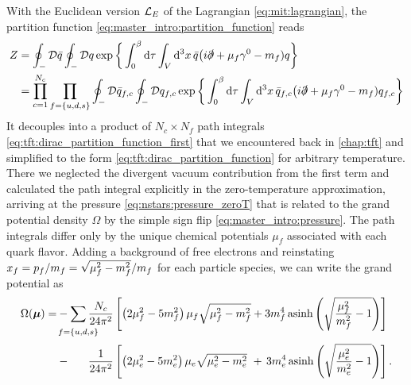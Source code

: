With the Euclidean version $\mathcal{L}_E$ of the Lagrangian \eqref{eq:mit:lagrangian},
the partition function \eqref{eq:master_intro:partition_function} reads
\begin{equation}
\begin{split}
	Z &= \oint_- \mathcal{D} \bar{q} \oint_- \mathcal{D} q \exp \bigg\{ \int_0^\beta \mathop{}\!\mathrm{d} \tau \int_V \mathop{}\!\mathrm{d}^3 x \, \bar{q} \big( i \slashed\partial + \mu_f \gamma^0 - m_f) q \bigg\} \\
	  &= \prod_{c=1}^{N_c} \prod_{f=\{u,d,s\}} \oint_- \mathcal{D} \bar{q}_{f,c} \oint_- \mathcal{D} q_{f,c} \exp \bigg\{ \int_0^\beta \mathop{}\!\mathrm{d} \tau \int_V \mathop{}\!\mathrm{d}^3 x \, \bar{q}_{f,c} \big( i \slashed\partial + \mu_f \gamma^0 - m_f) q_{f,c} \bigg\} \\
\end{split}
\end{equation}
It decouples into a product of $N_c \times N_f$ path integrals \eqref{eq:tft:dirac_partition_function_first} that we encountered back in \cref{chap:tft}
and simplified to the form \eqref{eq:tft:dirac_partition_function} for arbitrary temperature.
There we neglected the divergent vacuum contribution from the first term and calculated the path integral explicitly in the zero-temperature approximation,
arriving at the pressure \eqref{eq:nstars:pressure_zeroT} that is related to the grand potential density $\Omega$ by the simple sign flip \eqref{eq:master_intro:pressure}.
The path integrals differ only by the unique chemical potentials $\mu_f$ associated with each quark flavor.
Adding a background of free electrons and reinstating $x_f = p_f / m_f = \sqrt{\smash[b]{\mu_f^2-m_f^2}} / m_f$ for each particle species,
we can write the grand potential as
\begin{equation}
\begin{split}
	\Omega(\vec{\mu}) = &-\smashoperator{\sum_{\vphantom{\big|} f=\{u,d,s\}}} \frac{N_c}{24 \pi^2} \left[ \left( 2 \mu_f^2 - 5 m_f^2 \right) \mu_f \sqrt{\mu_f^2 - m_f^2} + 3 m_f^4 \asinh \left( \sqrt{\frac{\mu_{\smash{f}}^2}{m_f^2}-1} \right) \right] \\
	                    &-\phantom{\sum} \, \frac{1}{24 \pi^2} \left[ \left( 2 \mu_e^2 - 5 m_e^2 \right) \mu_e \sqrt{\mu_e^2 - m_e^2} \, \, + \, 3 m_e^4 \asinh \left( \sqrt{\frac{\mu_{\smash{e}}^2}{m_e^2}-1} \right) \right].
\label{eq:mit:grand_potential}
\end{split}
\end{equation}
